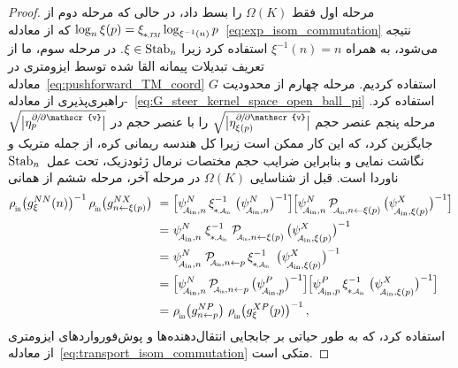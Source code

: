 \begin{proof}
    مرحله اول فقط $\Omega(K)$ را بسط داد، در حالی که مرحله دوم از $\log_n\xi(p) = \dxiTM \log_{\xi^{-1}(n)} p$ که از معادله~\eqref{eq:exp_isom_commutation} نتیجه می‌شود، به همراه $\xi^{-1}(n) = n$ استفاده کرد زیرا $\xi\in\operatorname{Stab}_{n}$.
    در مرحله سوم، ما از تعریف تبدیلات پیمانه القا شده توسط ایزومتری در معادله~\eqref{eq:pushforward_TM_coord} استفاده کردیم.
    مرحله چهارم از محدودیت $G$-راهبری‌پذیری از معادله~\eqref{eq:G_steer_kernel_space_open_ball_pi} استفاده کرد.
    مرحله پنجم عنصر حجم
    $\sqrt{\big|\eta_{\xi(p)}^{\partial\mkern-2mu/\mkern-2mu\partial\mathscr{v}}\big|}$
    را با عنصر حجم در
    $\sqrt{\big|\eta_p^{\partial\mkern-2mu/\mkern-2mu\partial\mathscr{v}}\big|}$
    جایگزین کرد، که این کار ممکن است زیرا کل هندسه ریمانی کره، از جمله متریک و نگاشت نمایی و بنابراین ضرایب حجم مختصات نرمال ژئودزیک، تحت عمل~$\operatorname{Stab}_{n}$ ناوردا است.
    قبل از شناسایی $\Omega(K)$ در مرحله آخر، مرحله ششم از همانی
    \begin{align}
        \rhoin\big( g_\xi^{NN}(n) \big)^{-1}\, \rhoin\big( g_{n\leftarrow\xi(p)}^{NX} \big)
        \ =&\ \pig[ \psiAinn^N\, \dxiAin^{-1}\, \big(\psiAinn^N \big)^{-1} \pig] \pig[ \psiAinn^N\, \PAinnxip\, \big(\psiAinxip^X \big)^{-1} \pig] \notag \\
        \ =&\ \psiAinn^N\; \dxiAin^{-1}\, \PAinnxip\, \big(\psiAinxip^X \big)^{-1} \notag \\
        \ =&\ \psiAinn^N\; \PAinnp\, \dxiAin^{-1}\ \big(\psiAinxip^X \big)^{-1} \notag \\
        \ =&\ \pig[ \psiAinn^N\, \PAinnp\, \big(\psiAinp^P \big)^{-1} \pig] \pig[ \psiAinp^P\, \dxiAin^{-1}\, \big(\psiAinxip^X \big)^{-1} \pig] \notag \\
        \ =&\ \rhoin\big( g_{n\leftarrow p}^{NP} \big)\ \rhoin\big( g_\xi^{XP}(p) \big)^{-1} \,,
    \end{align}
    استفاده کرد، که به طور حیاتی بر جابجایی انتقال‌دهنده‌ها و پوش‌فورواردهای ایزومتری از معادله~\eqref{eq:transport_isom_commutation} متکی است.



\end{proof}

